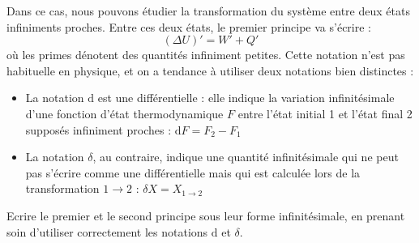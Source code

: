 \documentclass[11pt,fleqn]{book} %
\newcommand{\dd}{\mathrm{d}}
\begin{document}
Dans ce cas, nous pouvons étudier la transformation du système entre deux états infiniments proches. Entre ces deux états, le premier principe va s'écrire :
\begin{equation}
    (\Delta U)' = W' + Q'
\end{equation}
où les primes dénotent des quantités infiniment petites. Cette notation n'est pas habituelle en physique, et on a tendance à utiliser deux notations bien distinctes :
\begin{itemize}
    \item La notation $\dd$ est une différentielle : elle indique la variation infinitésimale d'une fonction d'état thermodynamique $F$ entre l'état initial 1 et l'état final 2 supposés infiniment proches : $\dd F = F_2 - F_1$
    \item La notation $\delta$, au contraire, indique une quantité infinitésimale qui ne peut pas s'écrire comme une différentielle mais qui est calculée lors de la transformation $1 \to 2$ : $\delta X = X_{1 \to 2}$
\end{itemize}
\begin{capex}
Ecrire le premier et le second principe sous leur forme infinitésimale, en prenant soin d'utiliser correctement les notations $\dd$ et $\delta$.
\end{capex}
\end{document}
